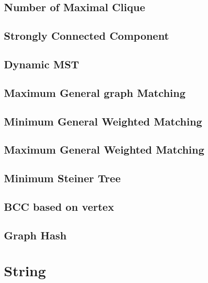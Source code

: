 \documentclass[a4paper,10pt,twocolumn,oneside]{article}
\begin{document}
\subsection{Number of Maximal Clique}


\subsection{Strongly Connected Component}


\subsection{Dynamic MST}


\subsection{Maximum General graph Matching}


\subsection{Minimum General Weighted Matching}


\subsection{Maximum General Weighted Matching}


\subsection{Minimum Steiner Tree}


\subsection{BCC based on vertex}


\subsection{Graph Hash}



\section{String}
\end{document}
